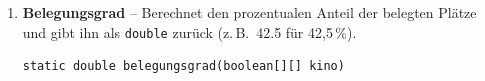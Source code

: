 \documentclass[
	fontsize=12pt,          %
	paper=a4,               %
	numbers=noenddot,       %
	listof=totoc,           %
	listof=entryprefix,     %
	listof=nochaptergap,    %
	bibliography=totoc,     %
	parskip=half            %
	openany                 %
]{scrbook}
\begin{document}
\begin{enumerate}[label=\textbf{\alph*)}]
\begin{hinweis}
	Für Teilaufgabe e) muss in jeder Reihe nach einem zusammenhängenden Block aus \texttt{anzahl} freien Plätzen gesucht werden. Überlege dir, wie du die Länge des aktuellen freien Bereichs beim Durchlaufen mitzählen kannst.
\end{hinweis}

\item \textbf{Belegungsgrad} -- Berechnet den prozentualen Anteil der belegten Plätze und gibt ihn als \texttt{double} zurück (z.\,B.\ 42.5 für 42{,}5\,\%).

\begin{lstlisting}
static double belegungsgrad(boolean[][] kino)
\end{lstlisting}

\end{enumerate}
\end{document}
